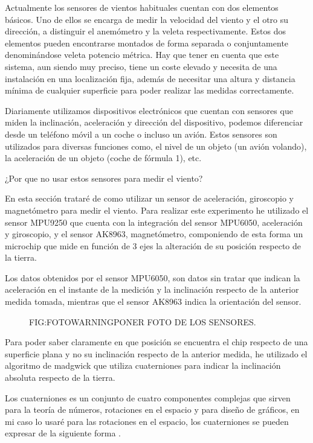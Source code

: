 
 Actualmente los sensores de vientos habituales cuentan con dos elementos básicos. Uno de ellos se encarga de medir la velocidad del viento y el otro su dirección, a distinguir el anemómetro y la veleta respectivamente. Estos dos elementos pueden encontrarse montados de forma separada o conjuntamente denominándose veleta potencio métrica.
 Hay que tener en cuenta que este sistema, aun siendo muy preciso, tiene un coste elevado y necesita de una instalación en una localización fija, además de necesitar una altura y distancia mínima de cualquier superficie para poder realizar las medidas correctamente.
 
 Diariamente utilizamos dispositivos electrónicos que cuentan con sensores que miden la inclinación, aceleración y dirección del dispositivo, podemos diferenciar desde un teléfono móvil a un coche o incluso un avión.
 Estos sensores son utilizados para diversas funciones como, el nivel de un objeto (un avión volando), la aceleración de un objeto (coche de fórmula 1), etc.
 
 ¿Por que no usar estos sensores para medir el viento?
 
 En esta sección trataré de como utilizar un sensor de aceleración, giroscopio y magnetómetro para medir el viento.
 Para realizar este experimento he utilizado el sensor MPU9250\cite{InvenSense2016} que cuenta con la integración del sensor MPU6050, aceleración y giroscopio, y el sensor AK8963, magnetómetro, componiendo de esta forma un microchip que mide en función de 3 ejes la alteración de su posición respecto de la tierra.
 
 Los datos obtenidos por el sensor MPU6050, son datos sin tratar que indican la aceleración en el instante de la medición y la inclinación respecto de la anterior medida tomada, mientras que el sensor AK8963 indica la orientación del sensor.
 
   \begin{figure}{FIG:FOTOWARNING}{PONER FOTO DE LOS SENSORES.}
\end{figure}
 
 Para poder saber claramente en que posición se encuentra el chip respecto de una superficie plana y no su inclinación respecto de la anterior medida, he utilizado el algoritmo de madgwick que utiliza cuaterniones para indicar la inclinación absoluta respecto de la tierra. 
 
 Los cuaterniones es un conjunto de cuatro componentes complejas que sirven para la teoría de números, rotaciones en el espacio y para diseño de gráficos, en mi caso lo usaré para las rotaciones en el espacio, los cuaterniones se pueden expresar de la siguiente forma \cite{Graves1999}.
 
